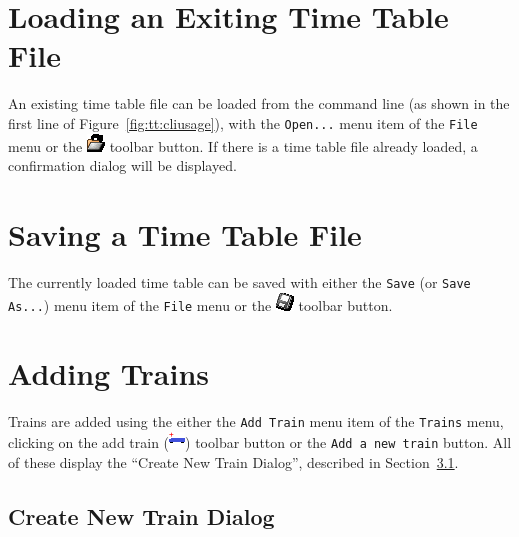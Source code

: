 \section{Loading an Exiting Time Table File}
\label{sect:tt:loadexistingtimetable}

An existing time table file can be loaded from the command line (as
shown in the first line of Figure~\ref{fig:tt:cliusage}),  with the
\texttt{Open...} menu item of the \texttt{File} menu or the
\includegraphics{TTOpenTool.png} toolbar button. If there is a time
table file already loaded, a confirmation dialog will be displayed.

\section{Saving a Time Table File}

The currently loaded time table can be saved with either the
\texttt{Save} (or \texttt{Save As...}) menu item of the \texttt{File} menu or
the \includegraphics{TTSaveTool.png} toolbar button. 

\section{Adding Trains}

Trains are added using the either the \texttt{Add Train} menu item of the
\texttt{Trains} menu, clicking on the add train
(\includegraphics{TTaddtrain.png}) toolbar button or the \texttt{Add a
new train} button. All of these display the ``Create New Train
Dialog'', described in Section~\ref{sect:tt:CreateNewTrainDialog}.

\subsection{Create New Train Dialog}
\label{sect:tt:CreateNewTrainDialog}


